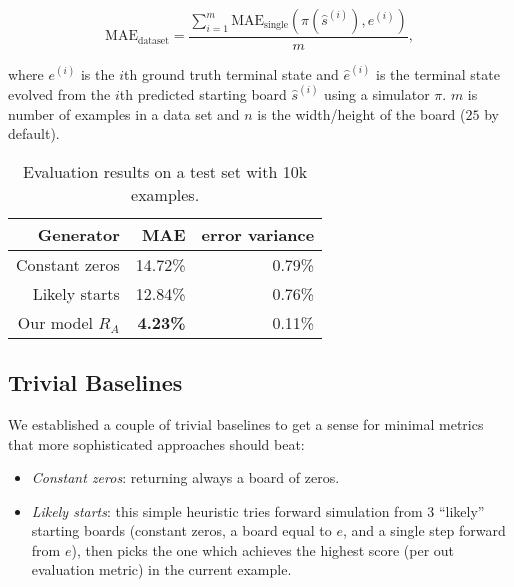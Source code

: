 \documentclass[conference]{IEEEtran}
\begin{document}
$$\mathrm{MAE}_{\text{dataset}} = \frac{\sum_{i=1}^{m} \mathrm{MAE}_{\text{single}}(\pi(\hat s^{(i)}), e^{(i)})}{m},$$


where $e^{(i)}$ is the $i$th ground truth terminal state and $\hat e^{(i)}$ is the terminal state evolved from the $i$th predicted starting board $\hat s^{(i)}$ using a simulator $\pi$. $m$ is number of examples in a data set and $n$ is the width/height of the board ($25$ by default).


\begin{table}
    \centering
    \caption{Evaluation results on a test set with 10k examples.}
    \label{tab:eval_results}

\begin{tabular}{rrr}
\hline
     Generator & MAE & error variance \\
\hline
 Constant zeros    & 14.72\%          & 0.79\% \\
 Likely starts  & 12.84\%          & 0.76\%     \\
 Our model $R_A$              & \textbf{4.23\%}           & 0.11\% \\
 \hline
\end{tabular}

\end{table}

\subsection{Trivial Baselines}
We established a couple of trivial baselines to get a sense for minimal metrics that more sophisticated approaches should beat:
\begin{itemize}
    \item {\it Constant zeros}: returning always a board of zeros.
    \item {\it Likely starts}: this simple heuristic tries forward simulation from 3 ``likely'' starting boards (constant zeros, a board equal to $e$, and a single step forward from $e$), then picks the one which achieves the highest score (per out evaluation metric) in the current example.
\end{itemize}
\end{document}

